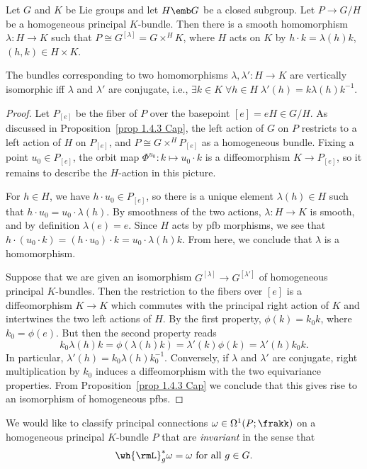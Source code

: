 \begin{lem}\label{lem 1.4.5 Cap}
    Let $G$ and $K$ be Lie groups and let $H\emb G$ be a closed subgroup. Let $P\to G\slash H$ be a homogeneous principal $K$-bundle. Then there is a smooth homomorphism $\lambda:H\to K$ such that $P\cong G^{[\lambda]}=G\times^H K$, where $H$ acts on $K$ by $h\cdot k=\lambda(h)k$, $(h,k)\in H\times K$.

    The bundles corresponding to two homomorphisms $\lambda,\lambda':H\to K$ are vertically isomorphic iff $\lambda$ and $\lambda'$ are conjugate, i.e., $\exists k\in K\;\forall h\in H \; \lambda'(h)=k\lambda(h)k^{-1}$.
\end{lem}
\begin{proof}
    Let $P_{[e]}$ be the fiber of $P$ over the basepoint $[e]=eH\in G\slash H$. As discussed in Proposition~\ref{prop 1.4.3 Cap}, the left action of $G$ on $P$ restricts to a left action of $H$ on $P_{[e]}$, and $P\cong G\times^H P_{[e]}$ as a homogeneous bundle. Fixing a point $u_0\in P_{[e]}$, the orbit map $\Phi^{u_0}:k\mapsto u_0\cdot k$ is a diffeomorphism $K\to P_{[e]}$, so it remains to describe the $H$-action in this picture.

    For $h\in H$, we have $h\cdot u_0\in P_{[e]}$, so there is a unique element $\lambda(h)\in H$ such that $h\cdot u_0=u_0\cdot\lambda(h)$. By smoothness of the two actions, $\lambda:H\to K$ is smooth, and by definition $\lambda(e)=e$. Since $H$ acts by \gls{pfb} morphisms, we see that $h\cdot(u_0\cdot k)=(h\cdot u_0)\cdot k=u_0\cdot \lambda(h)k$. From here, we conclude that $\lambda$ is a homomorphism.

    Suppose that we are given an isomorphism $G^{[\lambda]}\to G^{[\lambda']}$ of homogeneous principal $K$-bundles. Then the restriction to the fibers over $[e]$ is a diffeomorphism $K\to K$ which commutes with the principal right action of $K$ and intertwines the two left actions of $H$. By the first property, $\phi(k)=k_0k$, where $k_0=\phi(e)$. But then the second property reads 
    \[k_0\lambda(h)k=\phi(\lambda(h)k)=\lambda'(k)\phi(k)=\lambda'(h)k_0k.\]
    In particular, $\lambda'(h)=k_0\lambda(h)k_0^{-1}$. Conversely, if $\lambda$ and $\lambda'$ are conjugate, right multiplication by $k_0$ induces a diffeomorphism with the two equivariance properties. From Proposition~\ref{prop 1.4.3 Cap} we conclude that this gives rise to an isomorphism of homogeneous \glspl{pfb}.
\end{proof}

We would like to classify principal connections $\omega\in\Omega^1(P;\frakk)$ on a homogeneous principal $K$-bundle $P$ that are \emph{invariant} in the sense that 
\[\wh{\rmL}_g^\ast\omega=\omega \text{ for all }g\in G.\] 

